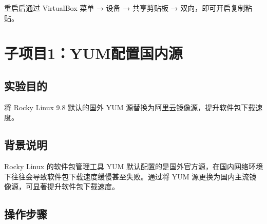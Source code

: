 \documentclass[12pt,a4paper]{ctexart}
\begin{document}
重启后通过 VirtualBox 菜单 → 设备 → 共享剪贴板 → 双向，即可开启复制粘贴。

\newpage
\section{子项目1：YUM配置国内源}

\subsection{实验目的}

将 Rocky Linux 9.8 默认的国外 YUM 源替换为阿里云镜像源，提升软件包下载速度。

\subsection{背景说明}

Rocky Linux 的软件包管理工具 YUM 默认配置的是国外官方源，在国内网络环境下往往会导致软件包下载速度缓慢甚至失败。通过将 YUM 源更换为国内主流镜像源，可显著提升软件包下载速度。

\subsection{操作步骤}
\end{document}
